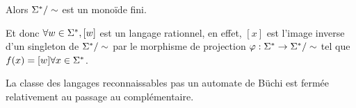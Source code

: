Alors $\Sigma^{*} / \sim$ est un monoïde fini.

Et donc $\forall w \in \Sigma^{*}, [w]$ est un langage rationnel, en effet, $[x]$ est l'image inverse d'un singleton de $\Sigma^{*} / \sim$
par le morphisme de projection $\varphi : \Sigma^{*} \to \Sigma^{*} / \sim$ tel que $f (x) = [w] \forall x \in \Sigma^{*}$.


\begin{prop}
	La classe des langages reconnaissables pas un automate de Büchi est fermée relativement au passage au complémentaire.
\end{prop}
